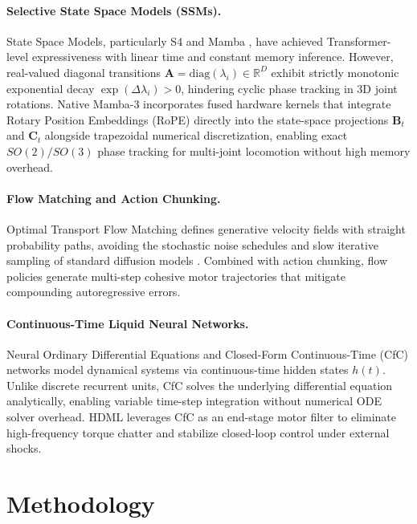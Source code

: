 \documentclass{article}
\begin{document}
\paragraph{Selective State Space Models (SSMs).} 
State Space Models, particularly S4 and Mamba \cite{gu2023mamba}, have achieved Transformer-level expressiveness with linear time and constant memory inference. However, real-valued diagonal transitions $\mathbf{A} = \text{diag}(\lambda_i) \in \mathbb{R}^D$ exhibit strictly monotonic exponential decay $\exp(\Delta \lambda_i) > 0$, hindering cyclic phase tracking in 3D joint rotations. Native Mamba-3 incorporates fused hardware kernels that integrate Rotary Position Embeddings (RoPE) \cite{su2024roformer} directly into the state-space projections $\mathbf{B}_t$ and $\mathbf{C}_t$ alongside trapezoidal numerical discretization, enabling exact $SO(2)/SO(3)$ phase tracking for multi-joint locomotion without high memory overhead.

\paragraph{Flow Matching and Action Chunking.}
Optimal Transport Flow Matching \cite{lipman2023flow} defines generative velocity fields with straight probability paths, avoiding the stochastic noise schedules and slow iterative sampling of standard diffusion models \cite{chi2023diffusion}. Combined with action chunking, flow policies generate multi-step cohesive motor trajectories that mitigate compounding autoregressive errors.

\paragraph{Continuous-Time Liquid Neural Networks.}
Neural Ordinary Differential Equations and Closed-Form Continuous-Time (CfC) networks \cite{hasani2022closed, lechner2020neural} model dynamical systems via continuous-time hidden states $h(t)$. Unlike discrete recurrent units, CfC solves the underlying differential equation analytically, enabling variable time-step integration without numerical ODE solver overhead. HDML leverages CfC as an end-stage motor filter to eliminate high-frequency torque chatter and stabilize closed-loop control under external shocks.

\section{Methodology}
\label{sec:method}
\end{document}
